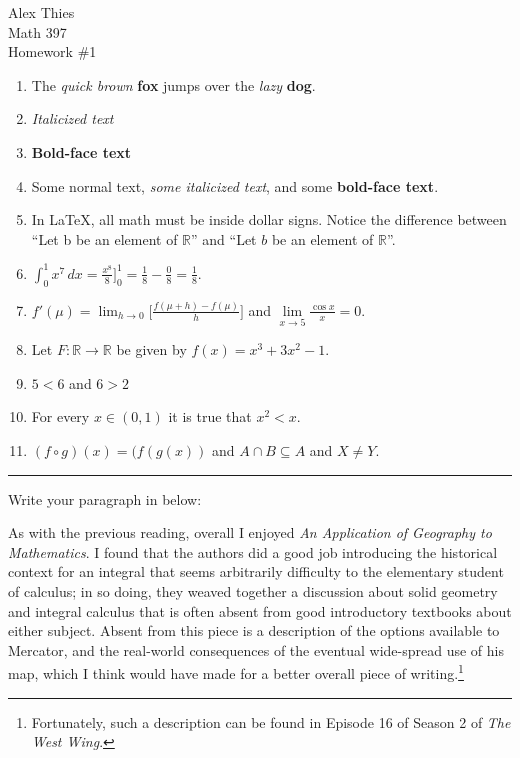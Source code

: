 \documentclass[12pt]{article}   %
\newcommand{\R}{\mathbb{R}}
\begin{document}
\bigskip

\begin{center}
Alex Thies \\
Math 397 \\
Homework \#1\\
\end{center}

\bigskip


\begin{enumerate}[(1)]
\item The \textit{quick brown} \textbf{fox} jumps over the \textit{lazy} \textbf{dog}.

\item {\it Italicized text}

\item {\bf Bold-face text}

\item Some normal text, {\it some italicized text}, and some {\bf bold-face text}.

\item In LaTeX, all math must be inside dollar signs.  Notice the difference between ``Let b be an element of $\R$'' and ``Let $b$ be an element of $\R$''.

\item $\displaystyle\int_{0}^1 x^7\, dx= \frac{x^8}{8} \Bigr ]^1_0 = \frac{1}{8}-\frac{0}{8}=\frac{1}{8}$.  

\item $f'(\mu)=\lim_{h \to 0} \Big [ \frac{f(\mu + h) - f(\mu)}{h} \Big ]$ and $\lim\limits_{x \to 5} \frac{\cos x}{x} =0$.


\item Let $F : \R \to \R$ be given by $f(x) = x^{3} + 3x^{2} - 1$.

\item $5<6$ and $6>2$

\item For every $x\in (0,1)$ it is true that $x^2 < x$.

\item $(f \circ g)(x) = (f(g(x))$ and $A \cap B \subseteq A$ and $X \neq Y$.
\end{enumerate}

\medskip

\hrule

\medskip

\noindent
Write your paragraph in below:



As with the previous reading, overall I enjoyed \textit{An Application of Geography to Mathematics}.
I found that the authors did a good job introducing the historical context for an integral that seems arbitrarily difficulty to the elementary student of calculus; in so doing, they weaved together a discussion about solid geometry and integral calculus that is often absent from good introductory textbooks about either subject.
Absent from this piece is a description of the options available to Mercator, and the real-world consequences of the eventual wide-spread use of his map, which I think would have made for a better overall piece of writing.\footnote{Fortunately, such a description can be found in Episode 16 of Season 2 of \textit{The West Wing}.}
\end{document}
